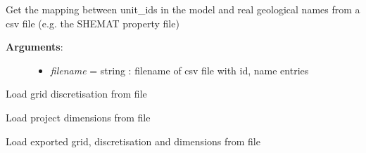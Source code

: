 \documentclass[letterpaper,10pt,english]{sphinxmanual}
\begin{document}
\begin{fulllineitems}
\begin{fulllineitems}
\begin{description}
\begin{itemize}
\end{itemize}

\end{description}

\end{fulllineitems}


\begin{fulllineitems}
\label{pygeomod:pygeomod.geogrid.GeoGrid.get_name_mapping_from_file}
Get the mapping between unit\_ids in the model and real geological names
from a csv file (e.g. the SHEMAT property file)
\begin{description}
\item[{\textbf{Arguments}:}] \leavevmode\begin{itemize}
\item {} 
\emph{filename} = string : filename of csv file with id, name entries

\end{itemize}

\end{description}

\end{fulllineitems}


\begin{fulllineitems}
\label{pygeomod:pygeomod.geogrid.GeoGrid.load_delxyz}
Load grid discretisation from file

\end{fulllineitems}


\begin{fulllineitems}
\label{pygeomod:pygeomod.geogrid.GeoGrid.load_dimensions}
Load project dimensions from file

\end{fulllineitems}


\begin{fulllineitems}
\label{pygeomod:pygeomod.geogrid.GeoGrid.load_grid}
Load exported grid, discretisation and dimensions from file


\end{fulllineitems}
\end{fulllineitems}
\end{document}
